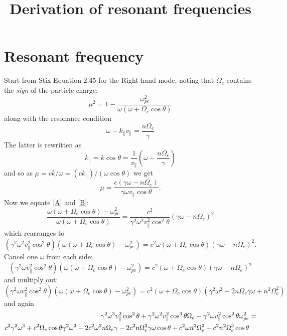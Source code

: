\documentclass[]{article}
\title{Derivation of resonant frequencies}
\begin{document}
\section{Resonant frequency}
Start from Stix Equation 2.45 for the Right hand mode, noting that $\Omega_c$ contains the \emph{sign} of the particle charge:
\begin{equation}\label{A}
\mu^2 =  1 - \frac {\omega_{pe}^2}{\omega(\omega + \Omega_e \cos\theta)}
\end{equation}
along with the resonance condition
\begin{equation}
\omega -k_\parallel v_\parallel = \frac{n \Omega_e}{\gamma}
\end{equation}
The latter is rewritten as
\begin{equation}
k_\parallel = k \cos\theta = \frac{1}{v_\parallel} \left(\omega - \frac{n \Omega_e}{\gamma} \right) \end{equation}
and so as $ \mu = c k /\omega = (c k_\parallel)/( \omega \cos\theta)$ we get
\begin{equation}\label{B}
\mu = \frac{c ( \gamma \omega - n \Omega_e)}{\gamma\omega v_\parallel \cos\theta}.
\end{equation}
Now we equate \ref{A} and \ref{B}:
\begin{equation}
\frac{\omega(\omega + \Omega_e \cos\theta) - \omega_{pe}^2}{\omega(\omega + \Omega_e \cos\theta)} = \frac{c^2}{\gamma^2 \omega^2 v_\parallel^2 \cos^2\theta} (\gamma \omega - n \Omega_e)^2 \end{equation}
which rearranges to
\begin{equation}
(\gamma^2 \omega^2 v_\parallel^2 \cos^2\theta) (\omega(\omega + \Omega_e \cos\theta) - \omega_{pe}^2) = c^2 \omega(\omega + \Omega_e \cos\theta)(\gamma \omega - n \Omega_e)^2. \end{equation}
Cancel one $\omega$ from each side:
\begin{equation}
(\gamma^2 \omega v_\parallel^2 \cos^2\theta) (\omega(\omega + \Omega_e \cos\theta) - \omega_{pe}^2) = c^2 (\omega + \Omega_e \cos\theta)(\gamma \omega - n \Omega_e)^2 \end{equation}
and multiply out:
\begin{equation}
(\gamma^2 \omega v_\parallel^2 \cos^2\theta) (\omega(\omega + \Omega_e \cos\theta) - \omega_{pe}^2) = c^2 (\omega + \Omega_e \cos\theta)(\gamma^2 \omega^2 -2 n \Omega_e \gamma \omega + n^2 \Omega_e^2) \end{equation}
and again
\begin{align}
\gamma^2\omega^3 v_\parallel^2 \cos^2 \theta + \gamma^2 \omega^2 v_\parallel^2 \cos^3\theta\Omega_e - \gamma^2\omega v_\parallel^2\cos^2\theta\omega_{pe}^2 &=\notag\\ c^2\gamma^2 \omega^3 + c^2 \Omega_e\cos\theta \gamma^2\omega^2 - 2 c^2 \omega^2 n\Omega_e\gamma - 2 c^2 n \Omega_e^2 \gamma\omega\cos\theta + c^2 \omega n^2\Omega_e^2 + c^2 n^2\Omega_e^3\cos\theta &
\end{align}
\end{document}
